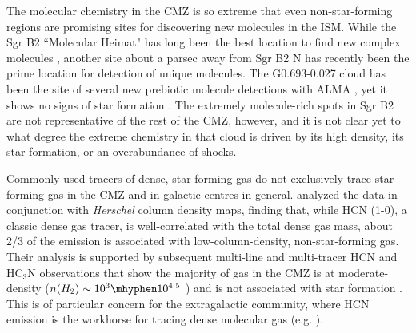 The molecular chemistry in the CMZ is so extreme that even non-star-forming regions are promising sites for discovering new molecules in the ISM.
While the Sgr B2 ``Molecular Heimat" has long been the best location to find new complex molecules \citep[e.g.][]{Belloche2013,Belloche2016,Belloche2019,Moller2021}, another site about a parsec away from Sgr B2 N has recently been the prime location for detection of unique molecules.
The G0.693-0.027 cloud has been the site of several new prebiotic molecule detections with ALMA \citep{Rivilla2020,Rivilla2021a,Rivilla2021b,Colzi2022}, yet it shows no signs of star formation \citep{Ginsburg2018b,Zeng2020}.
The extremely molecule-rich spots in Sgr B2 are not representative of the rest of the CMZ, however, and it is not clear yet to what degree the extreme chemistry in that cloud is driven by its high density, its star formation, or an overabundance of shocks.  

Commonly-used tracers of dense, star-forming gas do not exclusively trace star-forming gas in the CMZ and in galactic centres in general.
\citet{Mills2017b} analyzed the \citet{Jones2012} data in conjunction with {\em Herschel} column density maps, finding that, while HCN (1-0), a classic dense gas tracer, is well-correlated with the total dense gas mass, about 2/3 of the emission is associated with low-column-density, non-star-forming gas.
Their analysis is supported by subsequent multi-line and multi-tracer HCN and HC$_3$N observations that show the majority of gas in the CMZ is at moderate-density ($n(H_2)\sim10^3\mhyphen10^{4.5}$ \percc) and is not associated with star formation \citep{Mills2018c,Tanaka2018}.
This is of particular concern for the extragalactic community, where HCN emission is the workhorse for tracing dense molecular gas (e.g. \citealp{Usero2015, Bigiel2016, Querejeta2019, Beslic2021}). 

